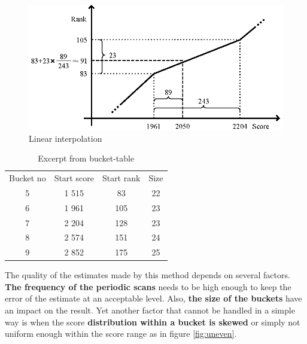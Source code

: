 \begin{figure}[h!]
  \centering
  \caption{Linear interpolation}
  \label{fig:linear}
  \includegraphics[width=13cm]{img/linear_interpolation.eps}
\end{figure}

\begin{table}[h]
  \begin{center}
  \begin{tabular}{ c c c c }
    Bucket no & Start score & Start rank & Size \\
    5 & 1 515 & 83 & 22 \\ 
    6 & 1 961 & 105 & 23 \\ 
    7 & 2 204 & 128 & 23 \\ 
    8 & 2 574 & 151 & 24 \\  
    9 & 2 852 & 175 & 25 \\ 
  \end{tabular} 
  \caption{Excerpt from bucket-table}
  \label{table:ranking-table}
  \end{center} 
\end{table}

The quality of the estimates made by this method depends on several factors.
\textbf{The frequency of the periodic scans} needs to be high enough to keep the error of the estimate at an acceptable level. Also, \textbf{the size of the buckets} have an impact on the result. Yet another factor that cannot be handled in a simple way is when the score \textbf{distribution within a bucket is skewed} or simply not uniform enough within the score range as in figure \ref{fig:uneven}.

